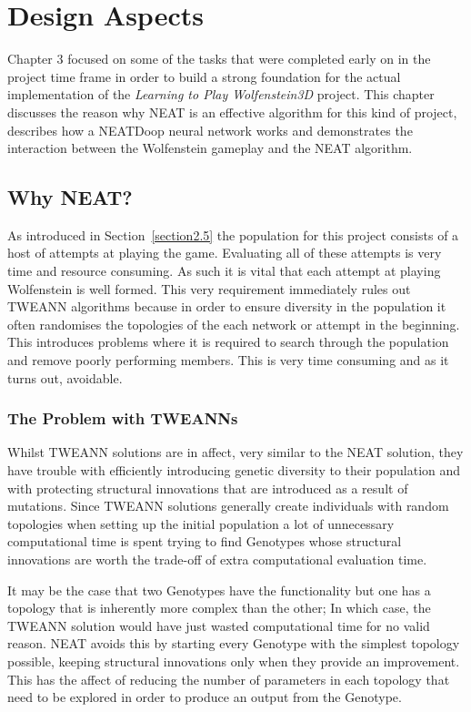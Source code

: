 \documentclass[]{Learning-to-Play-Wolfenstein-thesis}
\begin{document}
\chapter{Design Aspects}%
Chapter 3 focused on some of the tasks that were completed early on in the project time frame in order to build a strong foundation for the actual implementation of the \textit{Learning to Play Wolfenstein3D} project. This chapter discusses the reason why NEAT is an effective algorithm for this kind of project, describes how a NEATDoop neural network works and demonstrates the interaction between the Wolfenstein gameplay and the NEAT algorithm.

\section{Why NEAT?}
As introduced in Section~\ref{section2.5} the population for this project consists of a host of attempts at playing the game. Evaluating all of these attempts is very time and resource consuming. As such it is vital that each attempt at playing Wolfenstein is well formed. This very requirement immediately rules out TWEANN algorithms because in order to ensure diversity in the population it often randomises the topologies of the each network or attempt in the beginning. This introduces problems where it is required to search through the population and remove poorly performing members. This is very time consuming and as it turns out, avoidable.

\subsection{The Problem with TWEANNs}
Whilst TWEANN solutions are in affect, very similar to the NEAT solution, they have trouble with efficiently introducing genetic diversity to their population and with protecting structural innovations that are introduced as a result of mutations. Since TWEANN solutions generally create individuals with random topologies when setting up the initial population a lot of unnecessary computational time is spent trying to find Genotypes whose structural innovations are worth the trade-off of extra computational evaluation time. 

It may be the case that two Genotypes have the functionality but one has a topology that is inherently more complex than the other; In which case, the TWEANN solution would have just wasted computational time for no valid reason. NEAT avoids this by starting every Genotype with the simplest topology possible, keeping structural innovations only when they provide an improvement. This has the affect of reducing the number of parameters in each topology that need to be explored in order to produce an output from the Genotype. 
\end{document}
